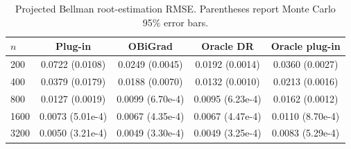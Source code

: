 \begin{table}[t]
\centering
\small
\setlength{\tabcolsep}{5pt}
\caption{Projected Bellman root-estimation RMSE. Parentheses report Monte Carlo 95\% error bars.}
\label{tab:generated-bellman-b3-root-rmse}
\begin{tabular}{lcccc}
\toprule
$n$ & Plug-in & OBiGrad & Oracle DR & Oracle plug-in \\
\midrule
200 & 0.0722 (0.0108) & 0.0249 (0.0045) & 0.0192 (0.0014) & 0.0360 (0.0027) \\
400 & 0.0379 (0.0179) & 0.0188 (0.0070) & 0.0132 (0.0010) & 0.0213 (0.0016) \\
800 & 0.0127 (0.0019) & 0.0099 (6.70e-4) & 0.0095 (6.23e-4) & 0.0162 (0.0012) \\
1600 & 0.0073 (5.01e-4) & 0.0067 (4.35e-4) & 0.0067 (4.47e-4) & 0.0110 (8.70e-4) \\
3200 & 0.0050 (3.21e-4) & 0.0049 (3.30e-4) & 0.0049 (3.25e-4) & 0.0083 (5.29e-4) \\
\bottomrule
\end{tabular}
\end{table}
